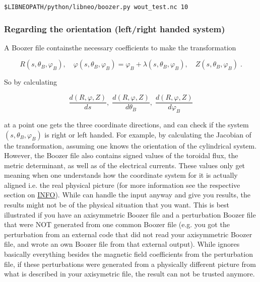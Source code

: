 \documentclass{article}
\newcommand{\vv}[1]{\texttt{\detokenize{#1}}}
\begin{document}
\begin{verbatim}
$LIBNEOPATH/python/libneo/boozer.py wout_test.nc 10
\end{verbatim}

\subsubsection{Regarding the orientation (left/right handed system)}
A Boozer file containsthe necessary coefficients to make the transformation 

\begin{equation*}
    R(s,\theta_B,\varphi_B),\quad \varphi(s,\theta_B,\varphi_B)= \varphi_B + \lambda(s,\theta_B,\varphi_B), \quad Z(s,\theta_B,\varphi_B) \; .
\end{equation*}

So by calculating

\begin{equation*}
	\frac{d(R,\varphi,Z)}{ds},\; \frac{d(R,\varphi,Z)}{d\theta_B},\; \frac{d(R,\varphi,Z)}{d\varphi_B}
\end{equation*}

at a point one gets the three coordinate directions, and can check if the 
system $(s,\theta_B,\varphi_B)$ is right or left handed. For example, by calculating
the Jacobian of the transformation, assuming one knows the orientation of the cylindrical system. 
However, the Boozer file also contains signed values of the toroidal flux, 
the metric determinant, as well as of the electrical currents. These values 
only get meaning when one understands how the coordinate system for it is 
actually aligned i.e. the real physical picture (for more information see the 
respective section on \href{https://gitlab.tugraz.at/plasma/info/-/blob/GeorgGrassler/TOPIC_MHD_Equilibria/Conventions.md}{INFO}). 
While \vv{NEO-2} can handle the input anyway and give you 
results, the results might not be of the physical situation that you want. 
This is best illustrated if you have an axisymmetric Boozer file and a 
perturbation Boozer file that were NOT generated from one common Boozer 
file (e.g. you got the perturbation from an external code that did not 
read your axisymmetric Boozer file, and wrote an own Boozer file from 
that external output). While \vv{NEO-2} ignores basically everything besides 
the magnetic field coefficients from the perturbation file, if these 
perturbations were generated from a physically different picture from
what is described in your axisymetric file, the result can not be trusted anymore.
\end{document}

